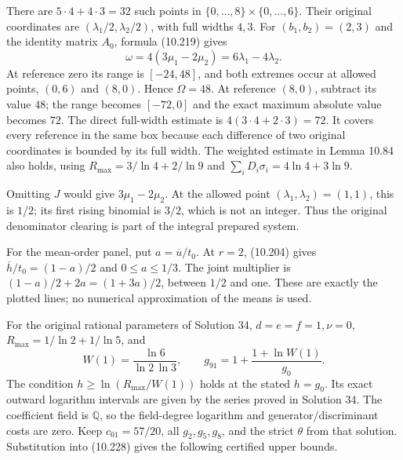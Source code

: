 \documentclass[
  11pt,
  a4paper,
]{article}
\begin{document}
There are \(5\cdot4+4\cdot3=32\) such points in
\(\{0,\ldots,8\}\times\{0,\ldots,6\}\). Their original coordinates are
\((\lambda_1/2,\lambda_2/2)\), with full widths \(4,3\). For
\((b_1,b_2)=(2,3)\) and the identity matrix \(A_0\), formula (10.219)
gives \[
\omega=4(3\mu_1-2\mu_2)=6\lambda_1-4\lambda_2.
\] At reference zero its range is \([-24,48]\), and both extremes occur
at allowed points, \((0,6)\) and \((8,0)\). Hence \(\Omega=48\). At
reference \((8,0)\), subtract its value \(48\); the range becomes
\([-72,0]\) and the exact maximum absolute value becomes \(72\). The
direct full-width estimate is \(4(3\cdot4+2\cdot3)=72\). It covers every
reference in the same box because each difference of two original
coordinates is bounded by its full width. The weighted estimate in Lemma
10.84 also holds, using \(R_{\max}=3/\ln4+2/\ln9\) and
\(\sum_iD_i\sigma_i=4\ln4+3\ln9\).

Omitting \(J\) would give \(3\mu_1-2\mu_2\). At the allowed point
\((\lambda_1,\lambda_2)=(1,1)\), this is \(1/2\); its first rising
binomial is \(3/2\), which is not an integer. Thus the original
denominator clearing is part of the integral prepared system.

For the mean-order panel, put \(a=\overline u/t_0\). At \(r=2\),
(10.204) gives \(\overline h/t_0=(1-a)/2\) and \(0\le a\le1/3\). The
joint multiplier is \((1-a)/2+2a=(1+3a)/2\), between \(1/2\) and one.
These are exactly the plotted lines; no numerical approximation of the
means is used.

For the original rational parameters of Solution 34, \(d=e=f=1,\nu=0\),
\(R_{\max}=1/\ln2+1/\ln5\), and \[
W(1)=\frac{\ln6}{\ln2\,\ln3},\qquad
g_{91}=1+\frac{1+\ln W(1)}{g_0}.
\] The condition \(h\ge\ln(R_{\max}/W(1))\) holds at the stated
\(h=g_0\). Its exact outward logarithm intervals are given by the series
proved in Solution 34. The coefficient field is \(\mathbb Q\), so the
field-degree logarithm and generator/discriminant costs are zero. Keep
\(c_{01}=57/20\), all \(g_2,g_5,g_8\), and the strict \(\theta\) from
that solution. Substitution into (10.228) gives the following certified
upper bounds.
\end{document}
